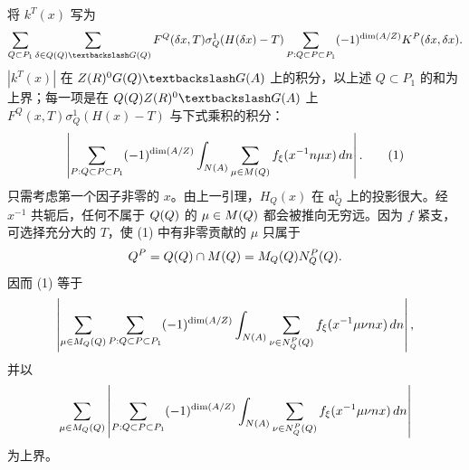 将 $k^T(x)$ 写为
\[
 \sum_{Q\subset P_1}\sum_{\delta\in Q(\Q)\backslash G(\Q)}
 F^Q(\delta x,T)\sigma_Q^1(H(\delta x)-T)
 \sum_{P:Q\subset P\subset P_1}(-1)^{\dim(A/Z)}K^P(\delta x,\delta x).
\]
$|k^T(x)|$ 在 $Z(\R)^0G(\Q)\backslash G(A)$ 上的积分，以上述 $Q\subset P_1$ 的和为上界；每一项是在 $Q(\Q)Z(\R)^0\backslash G(A)$ 上 $F^Q(x,T)\sigma_Q^1(H(x)-T)$ 与下式乘积的积分：
\begin{equation}
 \left|\sum_{P:Q\subset P\subset P_1}(-1)^{\dim(A/Z)}
 \int_{N(A)}\sum_{\mu\in M(Q)}f_\xi(x^{-1}n\mu x)\,dn\right|.\tag{1}
\end{equation}
只需考虑第一个因子非零的 $x$。由上一引理，$H_Q(x)$ 在 $\mathfrak a_Q^1$ 上的投影很大。经 $x^{-1}$ 共轭后，任何不属于 $Q(Q)$ 的 $\mu\in M(Q)$ 都会被推向无穷远。因为 $f$ 紧支，可选择充分大的 $T$，使 (1) 中有非零贡献的 $\mu$ 只属于
\[
 Q^P=Q(Q)\cap M(Q)=M_Q(Q)N_Q^P(Q).
\]
因而 (1) 等于
\[
 \left|\sum_{\mu\in M_Q(Q)}\sum_{P:Q\subset P\subset P_1}
 (-1)^{\dim(A/Z)}\int_{N(A)}\sum_{\nu\in N_Q^P(Q)}
 f_\xi(x^{-1}\mu\nu nx)\,dn\right|,
\]
并以
\[
 \sum_{\mu\in M_Q(Q)}\left|\sum_{P:Q\subset P\subset P_1}
 (-1)^{\dim(A/Z)}\int_{N(A)}\sum_{\nu\in N_Q^P(Q)}
 f_\xi(x^{-1}\mu\nu nx)\,dn\right|
\]
为上界。

